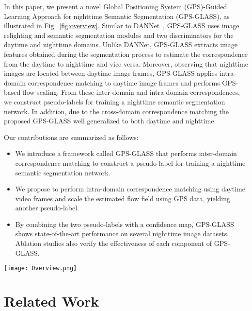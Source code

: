 \documentclass[10pt,twocolumn,letterpaper]{article}
\begin{document}
In this paper, we present a novel Global Positioning System (GPS)-Guided Learning Approach for nighttime Semantic Segmentation (GPS-GLASS), as illustrated in Fig.~\ref{fig:overview}. Similar to DANNet~\cite{wu2021dannet}, GPS-GLASS uses image relighting and semantic segmentation modules and two discriminators for the daytime and nighttime domains. Unlike DANNet, GPS-GLASS extracts image features obtained during the segmentation process to estimate the correspondence from the daytime to nighttime and vice versa. Moreover, observing that nighttime images are located between daytime image frames, GPS-GLASS applies intra-domain correspondence matching to daytime image frames and performs GPS-based flow scaling. From these inter-domain and intra-domain correspondences, we construct pseudo-labels for training a nighttime semantic segmentation network. In addition, due to the cross-domain correspondence matching the proposed GPS-GLASS well generalized to both daytime and nighttime.


Our contributions are summarized as follows:
\begin{itemize}
\item{We introduce a framework called GPS-GLASS that performs inter-domain correspondence matching to construct a pseudo-label for training a nighttime semantic segmentation network.}
\item {We propose to perform intra-domain correspondence matching using daytime video frames and scale the estimated flow field using GPS data, yielding another pseudo-label.}
\item{By combining the two pseudo-labels with a confidence map, GPS-GLASS shows state-of-the-art performance on several nighttime image datasets. Ablation studies also verify the effectiveness of each component of GPS-GLASS.}
\end{itemize}

\begin{figure*}[t]
  \texttt{[image: Overview.png]}
  \caption{The overview of the proposed GPS-GLASS. The same colored networks share weights, and the correlation layer has no weights that require training. \textcircled{w} represents the backward warping operator, and the red and blue dotted arrows indicate supervision by the ground-truth and pseudo-labels, respectively. Only the networks inside the purple box are used at the inference stage.}
  \label{fig:overview}
\end{figure*}

\section{Related Work}
\end{document}
